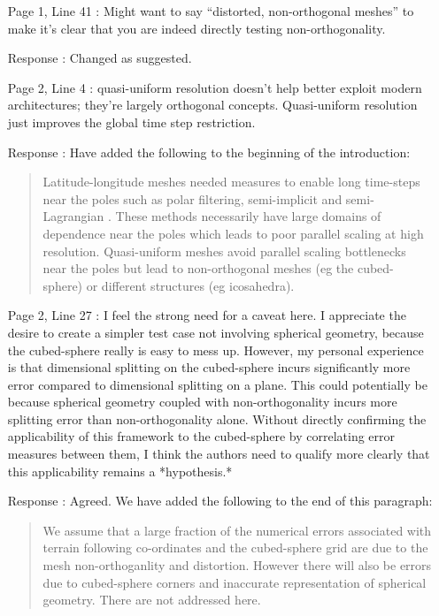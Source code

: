 \documentclass[12pt]{article}
\begin{document}
\begin{enumerate}
\item [Page 1, Line 41]: Might want to say ``distorted, non-orthogonal meshes'' to make it's clear that you are indeed directly testing non-orthogonality.

\item [Response]: Changed as suggested.

\item [Page 2, Line 4]: quasi-uniform resolution doesn't help better exploit modern architectures; they're largely orthogonal concepts. Quasi-uniform resolution just improves the global time step restriction.

\item [Response]: Have added the following to the beginning of the introduction:
\begin{quote}
Latitude-longitude meshes needed measures to enable long time-steps near the poles such as polar filtering, semi-implicit and semi-Lagrangian \cite[]{DCM+05}. These methods necessarily have large domains of dependence near the poles which leads to poor parallel scaling at high resolution. Quasi-uniform meshes avoid parallel scaling bottlenecks near the poles but lead to non-orthogonal meshes (eg the cubed-sphere) or different structures (eg icosahedra).
\end{quote}

\item [Page 2, Line 27]: I feel the strong need for a caveat here. I appreciate the desire to create a simpler test case not involving spherical geometry, because the cubed-sphere really is easy to mess up. However, my personal experience is that dimensional splitting  on the cubed-sphere incurs significantly more error compared to dimensional splitting on a plane. This could potentially be because spherical geometry coupled with non-orthogonality incurs more splitting error than non-orthogonality alone. Without directly confirming the applicability of this framework to the cubed-sphere by correlating error measures between them, I think the authors need to qualify more clearly that this applicability remains a *hypothesis.*

\item [Response]: Agreed. We have added the following to the end of this paragraph:
\begin{quote}
We assume that a large fraction of the numerical errors associated with terrain following co-ordinates and the cubed-sphere grid are due to the mesh non-orthoganlity and distortion. However there will also be errors due to cubed-sphere corners and inaccurate representation of spherical geometry. There are not addressed here. 
\end{quote}


\end{enumerate}
\end{document}
